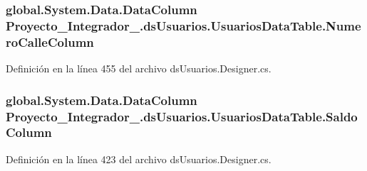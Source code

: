 \hypertarget{class_proyecto___integrador__3_1_1ds_usuarios_1_1_usuarios_data_table_a442769603ef31cf87b2a9fef73b9851e}{
\subsubsection[{Numero\-Calle\-Column}]{\setlength{\rightskip}{0pt plus 5cm}global.\-System.\-Data.\-Data\-Column Proyecto\-\_\-\-Integrador\-\_.\-ds\-Usuarios.\-Usuarios\-Data\-Table.\-Numero\-Calle\-Column\hspace{0.3cm}{\ttfamily [get]}}}\label{class_proyecto___integrador__3_1_1ds_usuarios_1_1_usuarios_data_table_a442769603ef31cf87b2a9fef73b9851e}


Definición en la línea 455 del archivo ds\-Usuarios.\-Designer.\-cs.

\hypertarget{class_proyecto___integrador__3_1_1ds_usuarios_1_1_usuarios_data_table_a0e728022751a9d5dffae82c0e1b66ade}{
\subsubsection[{Saldo\-Column}]{\setlength{\rightskip}{0pt plus 5cm}global.\-System.\-Data.\-Data\-Column Proyecto\-\_\-\-Integrador\-\_.\-ds\-Usuarios.\-Usuarios\-Data\-Table.\-Saldo\-Column\hspace{0.3cm}{\ttfamily [get]}}}\label{class_proyecto___integrador__3_1_1ds_usuarios_1_1_usuarios_data_table_a0e728022751a9d5dffae82c0e1b66ade}


Definición en la línea 423 del archivo ds\-Usuarios.\-Designer.\-cs.

